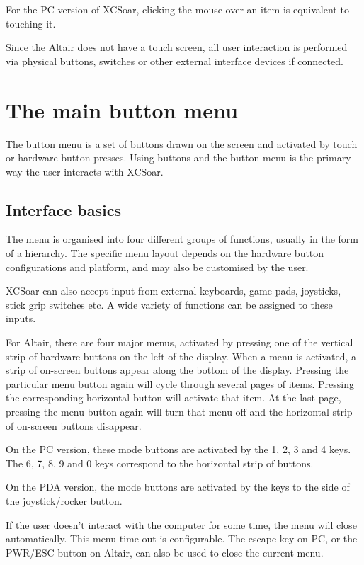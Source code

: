 For the PC version of XCSoar, clicking the mouse over an item is equivalent to
touching it.

Since the Altair does not have a touch screen, all user interaction is performed
via physical buttons, switches or other external interface devices if connected.

\section{The main button menu}
The button menu is a set of buttons drawn on the screen and activated by touch
or hardware button presses.  Using buttons and the button menu is the primary
way the user interacts with XCSoar.

\subsection*{Interface basics}
The menu is organised into four different groups of functions, usually in
the form of a hierarchy.  The specific menu layout depends on the
hardware button configurations and platform, and may also be customised by the
user.

XCSoar can also accept input from external keyboards, game-pads, joysticks,
stick grip switches etc. A wide variety of functions can be assigned to these
inputs.

For Altair, there are four major menus, activated by pressing one of
the vertical strip of hardware buttons on the left of the display.
When a menu is activated, a strip of on-screen buttons appear along the 
bottom of the display.  Pressing the particular menu button again will
cycle through several pages of items.  Pressing the corresponding
horizontal button will activate that item.  At the last page, pressing
the menu button again will turn that menu off and the horizontal strip
of on-screen buttons disappear.  

On the PC version, these mode buttons are activated by the
1, 2, 3 and 4 keys.  The 6, 7, 8, 9 and 0 keys correspond to the horizontal
strip of buttons.

On the PDA version, the mode buttons are activated by the keys to the
side of the joystick/rocker button.

If the user doesn't interact with the computer for some time, the
menu will close automatically.  This menu time-out is configurable.
The escape key on PC, or the PWR/ESC button on Altair, can
also be used to close the current menu.


